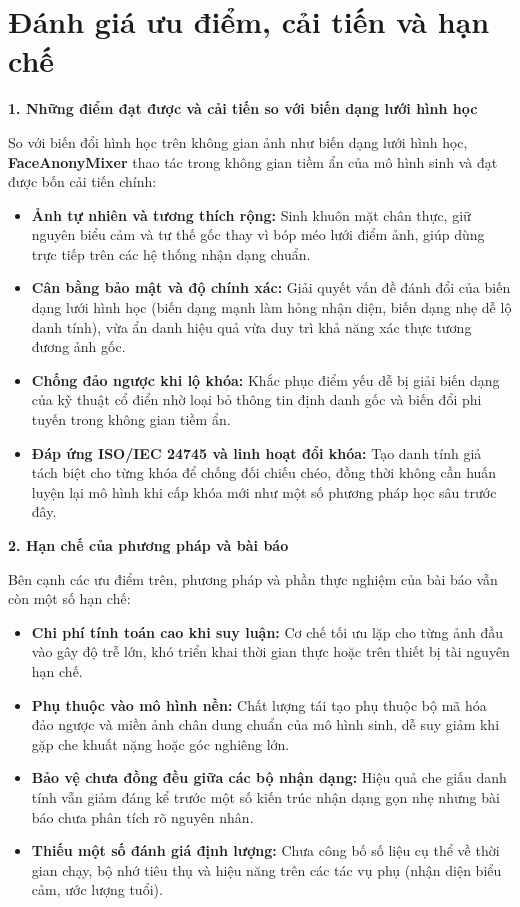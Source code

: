 \section{Đánh giá ưu điểm, cải tiến và hạn chế}
\label{sec::danh-gia-han-che}

\begingroup
\par\smallskip\noindent\textbf{1. Những điểm đạt được và cải tiến so với biến dạng lưới hình học}\par\smallskip
So với biến đổi hình học trên không gian ảnh như biến dạng lưới hình học, \textbf{FaceAnonyMixer} thao tác trong không gian tiềm ẩn của mô hình sinh và đạt được bốn cải tiến chính:
\begin{itemize}\setlength{\itemsep}{2pt}\setlength{\parskip}{0pt}
    \item \textbf{Ảnh tự nhiên và tương thích rộng:} Sinh khuôn mặt chân thực, giữ nguyên biểu cảm và tư thế gốc thay vì bóp méo lưới điểm ảnh, giúp dùng trực tiếp trên các hệ thống nhận dạng chuẩn.
    \item \textbf{Cân bằng bảo mật và độ chính xác:} Giải quyết vấn đề đánh đổi của biến dạng lưới hình học (biến dạng mạnh làm hỏng nhận diện, biến dạng nhẹ dễ lộ danh tính), vừa ẩn danh hiệu quả vừa duy trì khả năng xác thực tương đương ảnh gốc.
    \item \textbf{Chống đảo ngược khi lộ khóa:} Khắc phục điểm yếu dễ bị giải biến dạng của kỹ thuật cổ điển nhờ loại bỏ thông tin định danh gốc và biến đổi phi tuyến trong không gian tiềm ẩn.
    \item \textbf{Đáp ứng ISO/IEC 24745 và linh hoạt đổi khóa:} Tạo danh tính giả tách biệt cho từng khóa để chống đối chiếu chéo, đồng thời không cần huấn luyện lại mô hình khi cấp khóa mới như một số phương pháp học sâu trước đây.
\end{itemize}

\par\medskip\noindent\textbf{2. Hạn chế của phương pháp và bài báo}\par\smallskip
Bên cạnh các ưu điểm trên, phương pháp và phần thực nghiệm của bài báo vẫn còn một số hạn chế:
\begin{itemize}\setlength{\itemsep}{2pt}\setlength{\parskip}{0pt}
    \item \textbf{Chi phí tính toán cao khi suy luận:} Cơ chế tối ưu lặp cho từng ảnh đầu vào gây độ trễ lớn, khó triển khai thời gian thực hoặc trên thiết bị tài nguyên hạn chế.
    \item \textbf{Phụ thuộc vào mô hình nền:} Chất lượng tái tạo phụ thuộc bộ mã hóa đảo ngược và miền ảnh chân dung chuẩn của mô hình sinh, dễ suy giảm khi gặp che khuất nặng hoặc góc nghiêng lớn.
    \item \textbf{Bảo vệ chưa đồng đều giữa các bộ nhận dạng:} Hiệu quả che giấu danh tính vẫn giảm đáng kể trước một số kiến trúc nhận dạng gọn nhẹ nhưng bài báo chưa phân tích rõ nguyên nhân.
    \item \textbf{Thiếu một số đánh giá định lượng:} Chưa công bố số liệu cụ thể về thời gian chạy, bộ nhớ tiêu thụ và hiệu năng trên các tác vụ phụ (nhận diện biểu cảm, ước lượng tuổi).
\end{itemize}
\endgroup

